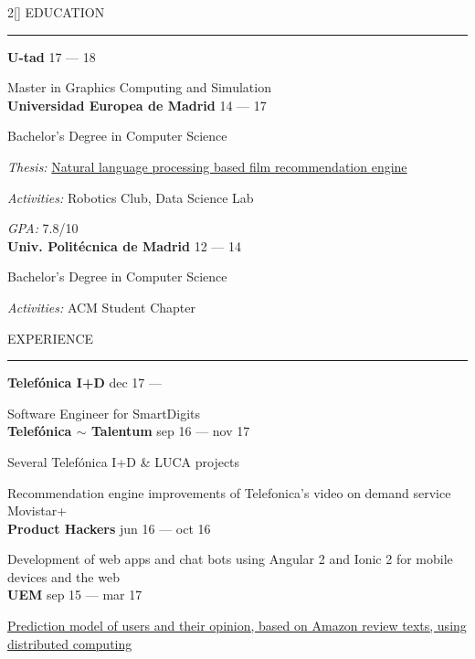 \documentclass[a4paper, 12pt]{article}
\newenvironment{myparacol}[2][]{%
\begin{paracol}{#2}[#1]\setlength{\parindent}{0pt}}{%
\end{paracol}}
\begin{document}
\setlength{\columnsep}{24pt}
\begin{sloppypar}
\begin{myparacol}{2}
    EDUCATION
    \vspace{1mm}
    \hrule
    \kern9pt
    \textbf{U-tad} \hfill 17 --- 18

    Master in Graphics Computing and Simulation\\

    \textbf{Universidad Europea de Madrid} \hfill 14 --- 17

    Bachelor's Degree in Computer Science

    \textit{Thesis:} \href{https://github.com/hugo19941994/movie-pepper-doc/raw/master/thesis.pdf}{Natural language processing based film recommendation engine}

    \textit{Activities:} Robotics Club, Data Science Lab

    \textit{GPA:} 7.8/10\\

    \textbf{Univ. Politécnica de Madrid} \hfill 12 --- 14

    Bachelor's Degree in Computer Science

    \textit{Activities:} ACM Student Chapter
    \\

    \switchcolumn{}

    EXPERIENCE
    \vspace{1mm}
    \hrule
    \kern9pt

    \textbf{Telefónica I+D} \hfill dec 17 ---

    Software Engineer for SmartDigits\\

    \textbf{Telefónica $\sim$ Talentum} \hfill sep 16 --- nov 17

    Several Telefónica I+D \& LUCA projects

    Recommendation engine improvements of Telefonica's video on demand service Movistar+\\

    \textbf{Product Hackers} \hfill jun 16 --- oct 16

    Development of web apps and chat bots using Angular 2 and Ionic 2 for mobile devices and the web\\

    \textbf{UEM} \hfill sep 15 --- mar 17

    \href{https://www.researchgate.net/publication/314142014_Prediction_of_User_Opinion_for_Products_-_A_Bag-of-Words_and_Collaborative_Filtering_based_Approach}{Prediction model of users and their opinion, based on Amazon review texts, using distributed computing}


\end{myparacol}
\end{sloppypar}
\end{document}
